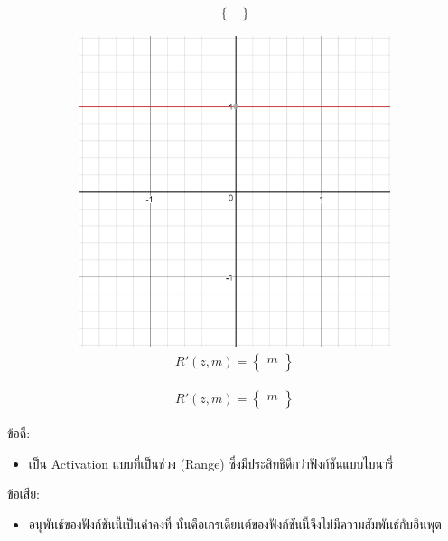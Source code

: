 \begin{itemize}
\begin{figure}[H]
\begin{subfigure}{0.5\textwidth}
{\begin{equation}
\begin{split}
\begin{Bmatrix}
                    \end{Bmatrix}\end{split}
                \end{equation}
            }
            \label{fig:actfunc_lin}
        \end{subfigure}%
        \begin{subfigure}{0.5\textwidth}
            \centering
            \includegraphics[width=0.9\linewidth]{fig/actfunc_linear_der.png}
            \caption{%
                \begin{equation}
                    \begin{split}R'(z,m) = \begin{Bmatrix} m \\
                    \end{Bmatrix}\end{split}
                \end{equation}
            }
            \label{fig:actfunc_lin_der}
        \end{subfigure}
    \end{figure}
    ข้อดี:
    \begin{itemize}
        \item เป็น Activation แบบที่เป็นช่วง (Range) ซึ่งมีประสิทธิดีกว่าฟังก์ชันแบบไบนารี่
    \end{itemize}
    ข้อเสีย:
    \begin{itemize}
        \item อนุพันธ์ของฟังก์ชันนี้เป็นค่าคงที่ นั่นคือเกรเดียนต์ของฟังก์ชันนี้จึงไม่มีความสัมพันธ์กับอินพุต
    \end{itemize}


\end{itemize}
